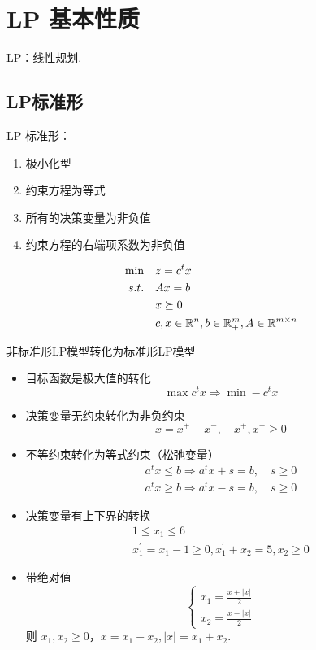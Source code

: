 \section{LP 基本性质}
LP：线性规划.

\subsection{LP标准形}
\begin{definition}
    LP 标准形：
    \begin{enumerate}
        \item 极小化型
        \item 约束方程为等式
        \item 所有的决策变量为非负值
        \item 约束方程的右端项系数为非负值
    \end{enumerate}
    \begin{align*}
        \min \quad &z = c^tx\\
        s.t. \quad &Ax = b\\
        &x \succeq 0\\
        &c, x \in \mathbb{R}^n, b \in \mathbb{R}^m_+, A \in \mathbb{R}^{m \times n}
    \end{align*}
\end{definition}

\begin{note}
    非标准形LP模型转化为标准形LP模型
    \begin{itemize}
        \item 目标函数是极大值的转化
        \[
            \max c^tx \Longrightarrow \min -c^tx  
        \]
        \item 决策变量无约束转化为非负约束
        \[
            x = x^{+} - x^{-}, \quad x^{+}, x^{-} \ge 0
        \]
        \item 不等约束转化为等式约束（松弛变量）
        \begin{gather*}
            a^tx \le b \Longrightarrow a^tx + s = b, \quad s \ge 0\\
            a^tx \ge b \Longrightarrow a^tx - s = b, \quad s \ge 0
        \end{gather*}
        \item 决策变量有上下界的转换
        \begin{gather*}
            1 \le x_1 \le 6\\
            x_1^{'} = x_1 - 1 \ge 0,x_1^{'} + x_2 = 5, x_2 \ge 0
        \end{gather*}
        \item 带绝对值
        \[\begin{cases}
            x_1 = \frac{x + |x|}{2}\\
            x_2 = \frac{x - |x|}{2}
        \end{cases}\]
        则 $x_1, x_2 \ge 0$，$x = x_1 - x_2, |x| = x_1 + x_2$.
    \end{itemize}
\end{note}


